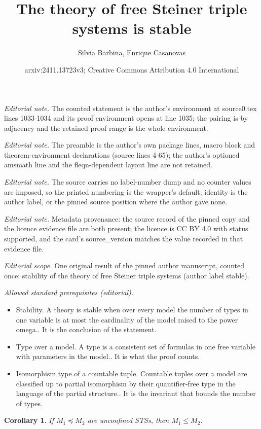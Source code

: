 \documentclass[10pt,a4paper]{article}
\title{The theory of free Steiner triple systems is stable}
\author{Silvia Barbina, Enrique Casanovas}
\date{arxiv:2411.13723v3; Creative Commons Attribution 4.0 International}
\theoremstyle{note}
\newtheorem{cor}[thm]{Corollary}
\begin{document}
\maketitle
\noindent\textit{Editorial note.} The counted statement is the author's environment at source0.tex lines 1033-1034 and its proof environment opens at line 1035; the pairing is by adjacency and the retained proof range is the whole environment.\par\medskip
\noindent\textit{Editorial note.} The preamble is the author's own package lines, macro block and theorem-environment declarations (source lines 4-65); the author's optioned amsmath line and the fleqn-dependent layout line are not retained.\par\medskip
\noindent\textit{Editorial note.} The source carries no label-number dump and no counter values are imposed, so the printed numbering is the wrapper's default; identity is the author label, or the pinned source position where the author gave none.\par\medskip
\noindent\textit{Editorial note.} Metadata provenance: the source record of the pinned copy and the licence evidence file are both present; the licence is CC BY 4.0 with status supported, and the card's source\_version matches the value recorded in that evidence file.\par\medskip
\noindent\textit{Editorial scope.} One original result of the pinned author manuscript, counted once: stability of the theory of free Steiner triple systems (author label stable).\par\medskip
\noindent\textit{Allowed standard prerequisites (editorial).}\begin{itemize}
\item Stability. A theory is stable when over every model the number of types in one variable is at most the cardinality of the model raised to the power omega.. It is the conclusion of the statement.
\item Type over a model. A type is a consistent set of formulas in one free variable with parameters in the model.. It is what the proof counts.
\item Isomorphism type of a countable tuple. Countable tuples over a model are classified up to partial isomorphism by their quantifier-free type in the language of the partial structure.. It is the invariant that bounds the number of types.
\end{itemize}\medskip
	\begin{cor}\label{Feb_23_2024_9}  If $M_1\preccurlyeq M_2$  are unconfined  STSs, then  $M_1\leq M_2$.
	\end{cor}
\end{document}
